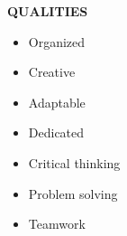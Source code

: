 \documentclass[../main.tex]{subfiles}
\begin{document}
\vspace*{0.6cm}

\textbf{\textcolor{myCV2}{QUALITIES\underline{\hspace{6.4cm}}}}

    \begin{itemize}
        \vspace*{-0.2cm}
        \item Organized
        \vspace*{-0.2cm}
        \item Creative
        \vspace*{-0.2cm}
        \item Adaptable
        \vspace*{-0.2cm}
        \item Dedicated
        \vspace*{-0.2cm}
        \item Critical thinking
        \vspace*{-0.2cm}
        \item Problem solving
        \vspace*{-0.2cm}
        \item Teamwork
    \end{itemize}
\end{document}
